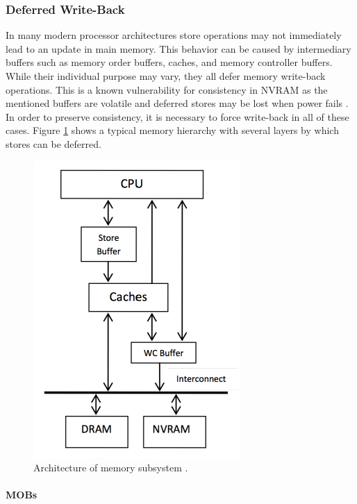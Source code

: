\subsubsection{Deferred Write-Back}

In many modern processor architectures store operations may not immediately
lead to an update in main memory. This behavior can be caused by intermediary
buffers such as memory order buffers, caches, and memory controller buffers.
While their individual purpose may vary, they all defer memory write-back
operations. This is a known vulnerability for consistency in \ac{NVRAM} as the
mentioned buffers are volatile and deferred stores may be lost when power fails
\cite{condit2009better, oukid2017data}. In order to preserve consistency, it is
necessary to force write-back in all of these cases. Figure
\ref{fig:memory-interface} shows a typical memory hierarchy with several layers
by which stores can be deferred.

\begin{figure}[h!]
    \centering
    \includegraphics[scale=0.9]{figures/nvram/memory-subsystem.pdf}
    \caption{Architecture of memory subsystem \cite{bhandari2012implications}.}
    \label{fig:memory-interface}
\end{figure}

\paragraph{\acp{MOB}}

